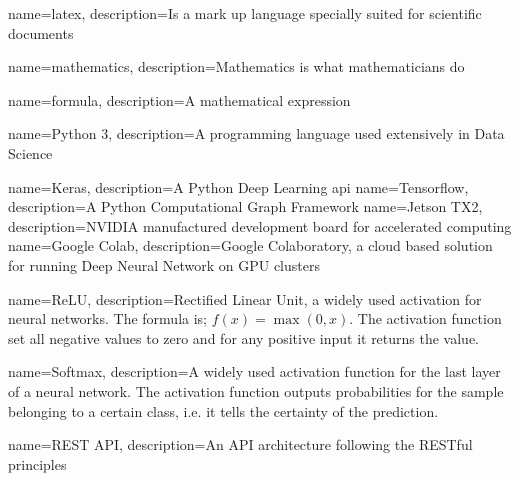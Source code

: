 {
	name=latex,
	description={Is a mark up language specially suited for 
		scientific documents}
}

{
	name=mathematics,
	description={Mathematics is what mathematicians do}
}

{
	name=formula,
	description={A mathematical expression}
}

{
	name=Python 3,
	description={A programming language used extensively in Data Science}
}



{
	name=Keras,
	description={A Python Deep Learning \acrshort{api}}
}
{
	name=Tensorflow,
	description={A Python Computational Graph Framework}
}
{
	name=Jetson TX2,
	description={NVIDIA manufactured development board for accelerated computing}
}
{
	name=Google Colab,
	description={Google Colaboratory, a cloud based solution for running Deep Neural Network on GPU clusters}
}

{
	name=ReLU,
	description={Rectified Linear Unit, a widely used activation for neural networks. The formula is; $f(x)=\max(0,x)$. The activation function set all negative values to zero and for any positive input it returns the value.}
}

{
	name=Softmax,
	description={A widely used activation function for the last layer of a neural network. The activation function outputs probabilities for the sample belonging to a certain class, i.e. it tells the certainty of the prediction.}
}

{
	name=REST API,
	description={An API architecture following the RESTful principles}
}

